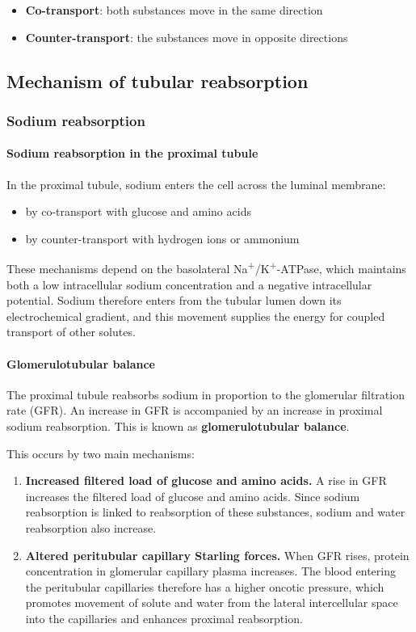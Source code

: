 \documentclass[11pt,a4paper]{article}
\begin{document}
\begin{itemize}
    \item \textbf{Co-transport}: both substances move in the same direction
    \item \textbf{Counter-transport}: the substances move in opposite directions
\end{itemize}

\subsection{Mechanism of tubular reabsorption}

\subsubsection{Sodium reabsorption}

\paragraph{Sodium reabsorption in the proximal tubule}

In the proximal tubule, sodium enters the cell across the luminal membrane:
\begin{itemize}
    \item by co-transport with glucose and amino acids
    \item by counter-transport with hydrogen ions or ammonium
\end{itemize}

These mechanisms depend on the basolateral Na\textsuperscript{+}/K\textsuperscript{+}-ATPase, which maintains both a low intracellular sodium concentration and a negative intracellular potential. Sodium therefore enters from the tubular lumen down its electrochemical gradient, and this movement supplies the energy for coupled transport of other solutes.

\paragraph{Glomerulotubular balance}

The proximal tubule reabsorbs sodium in proportion to the glomerular filtration rate (GFR). An increase in GFR is accompanied by an increase in proximal sodium reabsorption. This is known as \textbf{glomerulotubular balance}.

This occurs by two main mechanisms:
\begin{enumerate}
    \item \textbf{Increased filtered load of glucose and amino acids.} A rise in GFR increases the filtered load of glucose and amino acids. Since sodium reabsorption is linked to reabsorption of these substances, sodium and water reabsorption also increase.
    \item \textbf{Altered peritubular capillary Starling forces.} When GFR rises, protein concentration in glomerular capillary plasma increases. The blood entering the peritubular capillaries therefore has a higher oncotic pressure, which promotes movement of solute and water from the lateral intercellular space into the capillaries and enhances proximal reabsorption.
\end{enumerate}
\end{document}
